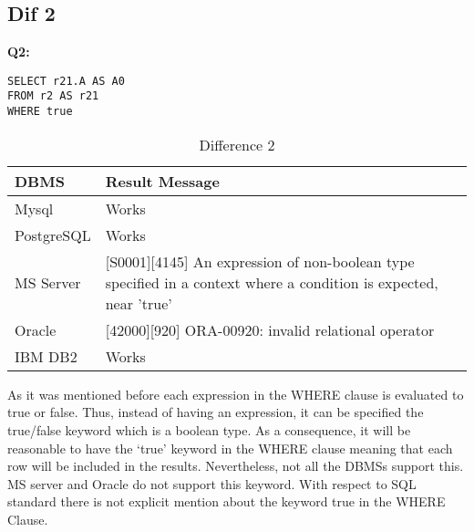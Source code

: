 \subsection{Dif 2}
  
\textbf{Q2:}
\begin{mdframed}[backgroundcolor=lightgray!20] 
\begin{lstlisting}[style=SQL]
SELECT r21.A AS A0 
FROM r2 AS r21
WHERE true
\end{lstlisting}
\end{mdframed}
 
 
\begin{table}[h]
\centering
\caption{Difference 2}
\label{my-label}
\begin{tabular}{|p{2cm}|p{11.5cm}| }
\hline
\textbf{DBMS} & \textbf{Result Message}                                                                                                   \\ \hline
Mysql         & Works                                                                                                                     \\ \hline
PostgreSQL    & Works                                                                                                                     \\ \hline
MS Server     & {[}S0001{]}{[}4145{]} An expression of non-boolean type specified in a context where a condition is expected, near 'true' \\ \hline
Oracle        & {[}42000{]}{[}920{]} ORA-00920: invalid relational operator                                                               \\ \hline
IBM DB2       & Works                                                                                                                     \\ \hline
\end{tabular}
\end{table}

As it was mentioned before each expression in the WHERE clause is evaluated to true or false. Thus, instead of having an expression, it can be specified the true/false keyword which is a boolean type. As a consequence, it will be reasonable to have the ‘true’ keyword in the WHERE clause meaning that each row will be included in the results. Nevertheless, not all the DBMSs support this. MS server and Oracle do not support this keyword. With respect to SQL standard there is not explicit mention about the keyword true in the WHERE Clause. 

